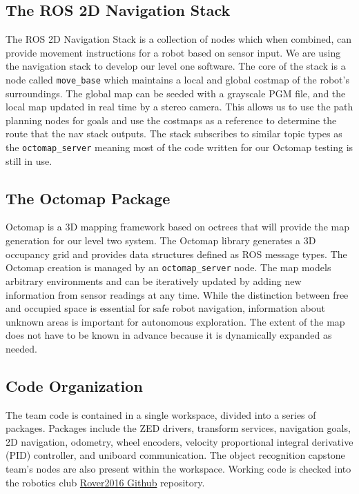 \documentclass[10pt, oneside,onecolumn]{IEEEtran}
\begin{document}
\subsection{The ROS 2D Navigation Stack}
The ROS 2D Navigation Stack is a collection of nodes which when combined, can provide movement instructions for a robot based on sensor input. We are using the navigation stack to develop our level one software. The core of the stack is a node called \texttt{move\_base} which maintains a local and global costmap of the robot's surroundings. The global map can be seeded with a grayscale PGM file, and the local map updated in real time by a stereo camera. This allows us to use the path planning nodes for goals and use the costmaps as a reference to determine the route that the nav stack outputs. The stack subscribes to similar topic types as the \texttt{octomap\_server} meaning most of the code written for our Octomap testing is still in use.

\subsection{The Octomap Package}
Octomap is a 3D mapping framework based on octrees that will provide the map generation for our level two system. The Octomap library generates a 3D occupancy grid and provides data structures defined as ROS message types. The Octomap creation is managed by an \texttt{octomap\_server} node. The map models arbitrary environments and can be iteratively updated by adding new information from sensor readings at any time. While the distinction between free and occupied space is essential for safe robot navigation, information about unknown areas is important for autonomous exploration. The extent of the map does not have to be known in advance because it is dynamically expanded as needed. 

\subsection{Code Organization}
The team code is contained in a single workspace, divided into a series of packages. Packages include the ZED drivers, transform services, navigation goals, 2D navigation, odometry, wheel encoders, velocity proportional integral derivative (PID) controller, and uniboard communication. The object recognition capstone team's nodes are also present within the workspace. Working code is checked into the robotics club \href{https://github.com/OSURoboticsClub/Rover2016}{Rover2016 Github} repository. 
\end{document}
